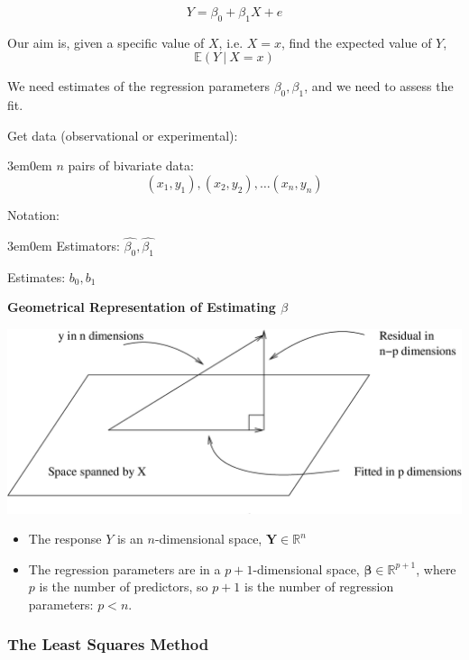 \documentclass[11pt]{article}
\newenvironment{indentone}{\begin{adjustwidth}{3em}{0em}}{\end{adjustwidth}}
\newcommand\VEC{\bm}{}
\newcommand{\R}{\mathbb R}			%
\theoremstyle{definition}
\numberwithin{equation}{section}
\begin{document}
\begin{equation}
 Y = \beta_0 + \beta_1 X + e
\end{equation}

Our aim is, given a specific value of $X$, i.e. $X = x$, find the expected value of $Y$,
\begin{equation}
  \mathbb{E}(Y\>|\>X = x)
\end{equation}

We need estimates of the regression parameters $\beta_0, \beta_1$, and we need to assess the fit.

Get data (observational or experimental):
\begin{indentone}
  $n$ pairs of bivariate data:
  \begin{equation}
    (x_1,y_1),(x_2,y_2),\dots(x_n,y_n)
  \end{equation}
\end{indentone}
  Notation:
  \begin{indentone}
    Estimators: $\hat{\beta_0},\hat{\beta_1}$

    Estimates: $b_0,b_1$
  \end{indentone}

\newpage

\textbf{Geometrical Representation of Estimating $\beta$}

\includegraphics[scale = 0.4]{images/faraway-2005-2.1}

\begin{itemize}
  \item The response $Y$ is an $n$-dimensional space, $\VEC{Y}\in\R^n$
  \item The regression parameters are in a $p+1$-dimensional space, $\VEC{\beta}\in\R^{p+1}$, where $p$ is the number of predictors, so $p+1$ is the number of regression parameters: $p < n$.
\end{itemize}

\subsubsection{The Least Squares Method}
\end{document}
